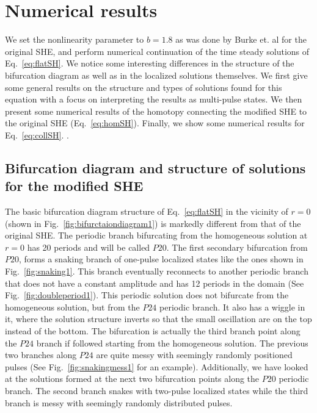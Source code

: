 \documentclass[../main/FlatMarginalStability.tex]{subfiles}
\begin{document}
\section{Numerical results}
We set the nonlinearity parameter to $b=1.8$ as was done by Burke et. al for the original SHE, and perform numerical continuation of the time steady solutions of Eq.~\ref{eq:flatSH}.   We notice some interesting differences in the structure of the bifurcation diagram as well as in the localized solutions themselves.  We first give some general results on the structure and types of solutions found for this equation with a focus on interpreting the results as multi-pulse states.  We then present some numerical results of the homotopy connecting the modified SHE to the original SHE (Eq.~\ref{eq:homSH}).  Finally, we show some numerical results for Eq.~\ref{eq:collSH}.  .


\subsection{Bifurcation diagram and structure of solutions for the modified SHE}
The basic bifurcation diagram structure of Eq.~\ref{eq:flatSH} in the vicinity of $r=0$ (shown in Fig.~\ref{fig:bifurctaiondiagram1}) is markedly different from that of the original SHE.
\FIGbifurcationdiagramA
The periodic branch bifurcating from the homogeneous solution at $r=0$ has 20 periods and will be called $P20$.  The first secondary bifurcation from $P20$, forms a snaking branch of one-pulse localized states like the ones shown in Fig.~\ref{fig:snaking1}.
\FIGsnakingA
This branch eventually reconnects to another periodic branch that does not have a constant amplitude and has 12 periods in the domain (See Fig.~\ref{fig:doubleperiod1}).
\FIGdoubleperiod
This periodic solution does not bifurcate from the homogeneous solution, but from the $P24$ periodic branch.  It also has a wiggle in it, where the solution structure inverts so that the small oscillation are on the top instead of the bottom. The bifurcation is  actually the third branch point along the $P24$ branch if followed starting from the homogeneous solution.  The previous two branches along $P24$ are quite messy with seemingly randomly positioned pulses (See Fig.~\ref{fig:snakingmess1} for an example).
\FIGsnakingmess  
Additionally, we have looked at the solutions formed at the next two bifurcation points along the $P20$ periodic branch.  The second branch snakes with two-pulse localized states while the third branch is messy with seemingly randomly distributed pulses.
\end{document}
